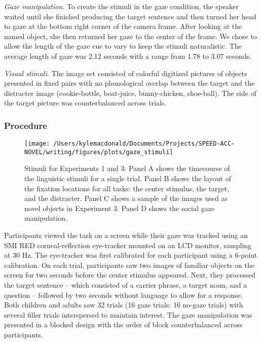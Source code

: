 \documentclass[man,floatsintext]{apa6}
\begin{document}
\emph{Gaze manipulation}. To create the stimuli in the gaze condition,
the speaker waited until she finished producing the target sentence and
then turned her head to gaze at the bottom right corner of the camera
frame. After looking at the named object, she then returned her gaze to
the center of the frame. We chose to allow the length of the gaze cue to
vary to keep the stimuli naturalistic. The average length of gaze was
2.12 seconds with a range from 1.78 to 3.07 seconds.

\emph{Visual stimuli.} The image set consisted of colorful digitized
pictures of objects presented in fixed pairs with no phonological
overlap between the target and the distracter image (cookie-bottle,
boat-juice, bunny-chicken, shoe-ball). The side of the target picture
was counterbalanced across trials.

\subsubsection{Procedure}\label{procedure}

\begin{figure}[!t]

{\centering \texttt{[image: /Users/kylemacdonald/Documents/Projects/SPEED-ACC-NOVEL/writing/figures/plots/gaze\_stimuli]} 

}

\caption{Stimuli for Experiments 1 and 3. Panel A shows the timecourse of the linguistic stimuli for a single trial. Panel B shows the layout of the fixation locations for all tasks: the center stimulus, the target, and the distracter. Panel C shows a sample of the images used as novel objects in Experiment 3. Panel D shows the social gaze manipulation.}\label{fig:gaze-stimuli}
\end{figure}

Participants viewed the task on a screen while their gaze was tracked
using an SMI RED corneal-reflection eye-tracker mounted on an LCD
monitor, sampling at 30 Hz. The eye-tracker was first calibrated for
each participant using a 6-point calibration. On each trial,
participants saw two images of familiar objects on the screen for two
seconds before the center stimulus appeared. Next, they processed the
target sentence -- which consisted of a carrier phrase, a target noun,
and a question -- followed by two seconds without language to allow for
a response. Both children and adults saw 32 trials (16 gaze trials; 16
no-gaze trials) with several filler trials interspersed to maintain
interest. The gaze manipulation was presented in a blocked design with
the order of block counterbalanced across participants.
\end{document}

